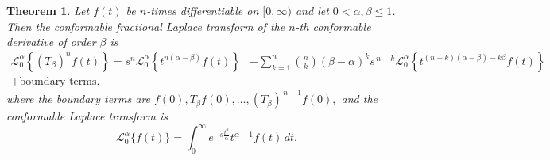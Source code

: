 \documentclass[10pt,a4paper]{amsart}
\newtheorem{theorem}{Theorem}
\begin{document}
\begin{theorem}
Let $f(t)$ be $n$-times differentiable on $[0,\infty)$ and let $0<\alpha,\beta\leq 1$. Then the conformable fractional Laplace transform of the $n$-th conformable derivative of order $\beta$ is
\begin{align*}
\mathcal{L}_0^{\alpha} \left\{ (T_\beta)^n f(t) \right\} = s^n \mathcal{L}_0^{\alpha} \left\{ t^{n(\alpha-\beta)} f(t) \right\} 
&+ \sum_{k=1}^n \binom{n}{k} (\beta-\alpha)^k s^{\,n-k} \mathcal{L}_0^{\alpha} \left\{ t^{(n-k)(\alpha-\beta)-k\beta} f(t) \right\} \\
+ \text{boundary terms}.
\end{align*}
where the boundary terms are
$
f(0), T_\beta f(0), \ldots, (T_\beta)^{\,n-1} f(0),
$ and the conformable Laplace transform is
\[
\mathcal{L}_0^{\alpha} \{ f(t) \} = \int_0^\infty e^{-s \frac{t^\alpha}{\alpha}} t^{\alpha-1} f(t) \, dt.
\]
\end{theorem}
\end{document}
